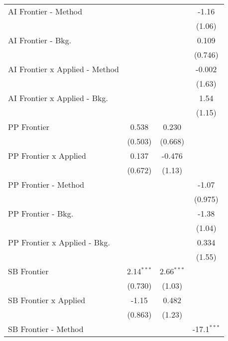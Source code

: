 \begin{tabular}{lccc}
   AI Frontier - Method           &               &              & -1.16\\   
                                  &               &              & (1.06)\\   
   AI Frontier - Bkg.             &               &              & 0.109\\   
                                  &               &              & (0.746)\\   
   AI Frontier x Applied - Method &               &              & -0.002\\   
                                  &               &              & (1.63)\\   
   AI Frontier x Applied - Bkg.   &               &              & 1.54\\   
                                  &               &              & (1.15)\\   
   PP Frontier                    & 0.538         & 0.230        &   \\   
                                  & (0.503)       & (0.668)      &   \\   
   PP Frontier x Applied          & 0.137         & -0.476       &   \\   
                                  & (0.672)       & (1.13)       &   \\   
   PP Frontier - Method           &               &              & -1.07\\   
                                  &               &              & (0.975)\\   
   PP Frontier - Bkg.             &               &              & -1.38\\   
                                  &               &              & (1.04)\\   
   PP Frontier x Applied - Bkg.   &               &              & 0.334\\   
                                  &               &              & (1.55)\\   
   SB Frontier                    & 2.14$^{***}$  & 2.66$^{***}$ &   \\   
                                  & (0.730)       & (1.03)       &   \\   
   SB Frontier x Applied          & -1.15         & 0.482        &   \\   
                                  & (0.863)       & (1.23)       &   \\   
   SB Frontier - Method           &               &              & -17.1$^{***}$\\   

\end{tabular}
